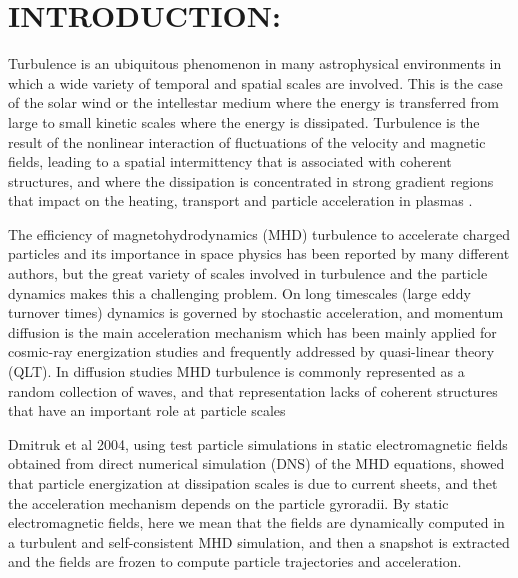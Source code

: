 \documentclass[%
aip,pop,amsmath,amssymb,
 reprint,%
]{revtex4-1}
\begin{document}
%

\section{\label{sec:level1}INTRODUCTION:}
Turbulence is an ubiquitous phenomenon in many astrophysical 
environments in which a wide  
variety of temporal and spatial scales are involved. This is the case of 
the solar wind or the 
intellestar medium where the energy is transferred from 
large to small kinetic scales where the energy is dissipated. 
Turbulence is the result of the  nonlinear 
interaction of fluctuations of the velocity and magnetic fields, 
leading to a spatial intermittency that is associated with coherent structures,
and where the dissipation is concentrated in strong gradient regions that impact on the
 heating, transport and particle acceleration in plasmas \cite{M1}.

The efficiency of magnetohydrodynamics (MHD) turbulence to accelerate charged particles 
and its importance in space 
physics has been reported by many different authors\cite{F1,L1,M2}, 
but the great variety of 
scales involved in turbulence and the particle dynamics
makes this a challenging problem.
On long timescales (large eddy turnover times) dynamics is
governed by stochastic acceleration, and momentum diffusion is
the main acceleration 
mechanism which has been mainly applied for cosmic-ray energization 
studies and frequently
addressed by quasi-linear theory (QLT)\cite{S1,CH1,Lange1}. 
In diffusion studies 
MHD turbulence is commonly represented as a random 
collection of waves, and that 
representation lacks of coherent structures that have an important role 
at particle scales\cite{Vlahos}

Dmitruk et al 2004\cite{PD1}, 
using test particle simulations in static electromagnetic fields obtained 
from direct numerical simulation (DNS) of the MHD equations, showed that particle 
energization at dissipation scales is due to current sheets, and thet the acceleration
mechanism depends on the particle gyroradii. By static electromagnetic fields, here we mean
that the fields are dynamically computed in a turbulent and self-consistent MHD simulation,
and then a snapshot is extracted and the fields are frozen to compute particle trajectories
and acceleration.
\end{document}

